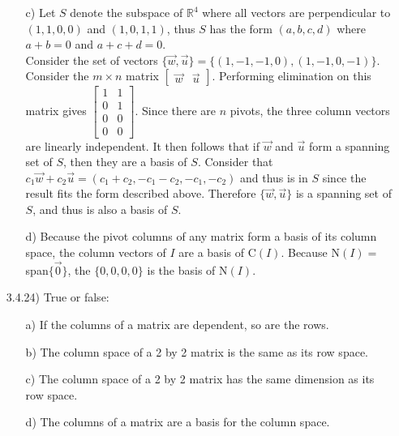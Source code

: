 \documentclass[12pt]{article}
\begin{document}
\begin{itemize}
\begin{itemize}
\item[c)] Let $S$ denote the subspace of $\mathbb{R}^4$ where all vectors are perpendicular to  $(1,1,0,0)$ and $(1,0,1,1)$, thus $S$ has the form $(a,b,c,d)$ where $a+b=0$ and $a+c+d=0$.\\
Consider the set of vectors $\{\vec{w}, \vec{u}\} = \{(1,-1,-1,0),(1,-1,0,-1)\}$. Consider the $m \times n$ matrix
$\left[\begin{array}{cc} \vec{w} & \vec{u}\end{array}\right]$. Performing elimination on this matrix gives 
$\left[\begin{array}{cc}
1 & 1 \\ 
0 & 1 \\
0 & 0 \\
0 & 0
\end{array}\right]$. Since there are $n$ pivots, the three column vectors are linearly independent. It then follows that if $\vec{w}$ and $\vec{u}$ form a spanning set of $S$, then they are a basis of $S$. Consider that $c_1\vec{w}+c_2\vec{u}=(c_1+c_2,-c_1-c_2,-c_1,-c_2)$ and thus is in $S$ since the result fits the form described above. Therefore $\{\vec{w}, \vec{u}\}$ is a spanning set of $S$, and thus is also a basis of $S$.
\item[d)] Because the pivot columns of any matrix form a basis of its column space, the column vectors of $I$ are a basis of C$(I)$. Because N$(I)=$ span$\{\vec{0}\}$, the $\{0,0,0,0\}$ is the basis of N$(I)$.
\end{itemize}

\item[3.4.24)] True or false:
\begin{itemize}
\item[a)] If the columns of a matrix are dependent, so are the rows.
\item[b)] The column space of a 2 by 2 matrix is the same as its row space.
\item[c)] The column space of a 2 by 2 matrix has the same dimension as its row space.
\item[d)] The columns of a matrix are a basis for the column space.
\end{itemize}


\end{itemize}
\end{document}
